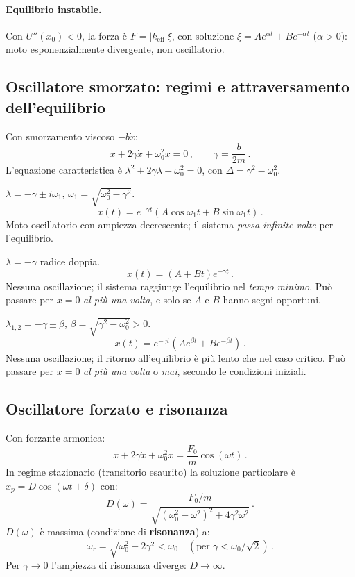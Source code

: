 \documentclass[11pt,a4paper]{article}
\theoremstyle{plain}
\theoremstyle{definition}
\theoremstyle{remark}
\begin{document}
\paragraph{Equilibrio instabile.}
Con $U''(x_0)<0$, la forza è $F=|k_\mathrm{eff}|\xi$, con soluzione
$\xi=Ae^{\alpha t}+Be^{-\alpha t}$ ($\alpha>0$): moto esponenzialmente
divergente, non oscillatorio.

\subsection{Oscillatore smorzato: regimi e attraversamento dell'equilibrio}

Con smorzamento viscoso $-b\dot x$:
\[
  \ddot x+2\gamma\dot x+\omega_0^2 x=0\,,\qquad\gamma=\frac{b}{2m}\,.
\]
L'equazione caratteristica è $\lambda^2+2\gamma\lambda+\omega_0^2=0$, con
$\Delta=\gamma^2-\omega_0^2$.

\begin{description}[leftmargin=2em]
  \item[Sottosmorzato ($\gamma<\omega_0$, $\Delta<0$):]
    $\lambda=-\gamma\pm i\omega_1$, $\omega_1=\sqrt{\omega_0^2-\gamma^2}$.
    \[x(t)=e^{-\gamma t}(A\cos\omega_1 t+B\sin\omega_1 t)\,.\]
    Moto oscillatorio con ampiezza decrescente; il sistema \emph{passa infinite
    volte} per l'equilibrio.

  \item[Criticamente smorzato ($\gamma=\omega_0$, $\Delta=0$):]
    $\lambda=-\gamma$ radice doppia.
    \[x(t)=(A+Bt)e^{-\gamma t}\,.\]
    Nessuna oscillazione; il sistema raggiunge l'equilibrio nel \emph{tempo
    minimo}. Può passare per $x=0$ \emph{al più una volta}, e solo se $A$ e
    $B$ hanno segni opportuni.

  \item[Sovrasmorzato ($\gamma>\omega_0$, $\Delta>0$):]
    $\lambda_{1,2}=-\gamma\pm\beta$, $\beta=\sqrt{\gamma^2-\omega_0^2}>0$.
    \[x(t)=e^{-\gamma t}(Ae^{\beta t}+Be^{-\beta t})\,.\]
    Nessuna oscillazione; il ritorno all'equilibrio è più lento che nel caso
    critico. Può passare per $x=0$ \emph{al più una volta} o \emph{mai},
    secondo le condizioni iniziali.
\end{description}

\subsection{Oscillatore forzato e risonanza}

Con forzante armonica:
\[
  \ddot x+2\gamma\dot x+\omega_0^2 x=\frac{F_0}{m}\cos(\omega t)\,.
\]
In regime stazionario (transitorio esaurito) la soluzione particolare è
$x_p=D\cos(\omega t+\delta)$ con:
\[
  D(\omega)=\frac{F_0/m}{\sqrt{(\omega_0^2-\omega^2)^2+4\gamma^2\omega^2}}\,.
\]
$D(\omega)$ è massima (condizione di \textbf{risonanza}) a:
\[
  \omega_r=\sqrt{\omega_0^2-2\gamma^2}<\omega_0\quad
  (\text{per }\gamma<\omega_0/\sqrt{2})\,.
\]
Per $\gamma\to 0$ l'ampiezza di risonanza diverge: $D\to\infty$.
\end{document}
